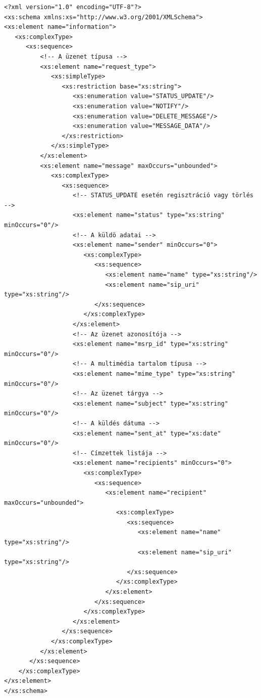\begin{verbatim}
<?xml version="1.0" encoding="UTF-8"?>
<xs:schema xmlns:xs="http://www.w3.org/2001/XMLSchema"> 
<xs:element name="information">
   <xs:complexType>
      <xs:sequence>
          <!-- A üzenet típusa -->
          <xs:element name="request_type">
             <xs:simpleType>
                <xs:restriction base="xs:string">                        
                   <xs:enumeration value="STATUS_UPDATE"/>
                   <xs:enumeration value="NOTIFY"/>
                   <xs:enumeration value="DELETE_MESSAGE"/>
                   <xs:enumeration value="MESSAGE_DATA"/>
                </xs:restriction>
             </xs:simpleType>
          </xs:element>                                    
          <xs:element name="message" maxOccurs="unbounded">
             <xs:complexType>                    
                <xs:sequence>
                   <!-- STATUS_UPDATE esetén regisztráció vagy törlés -->
                   <xs:element name="status" type="xs:string" minOccurs="0"/>
                   <!-- A küldö adatai -->
                   <xs:element name="sender" minOccurs="0">
                      <xs:complexType>
                         <xs:sequence>
                            <xs:element name="name" type="xs:string"/>
                            <xs:element name="sip_uri" type="xs:string"/>
                         </xs:sequence>
                      </xs:complexType>
                   </xs:element>
                   <!-- Az üzenet azonosítója -->
                   <xs:element name="msrp_id" type="xs:string" minOccurs="0"/>
                   <!-- A multimédia tartalom típusa -->
                   <xs:element name="mime_type" type="xs:string" minOccurs="0"/>
                   <!-- Az üzenet tárgya -->
                   <xs:element name="subject" type="xs:string" minOccurs="0"/>
                   <!-- A küldés dátuma -->
                   <xs:element name="sent_at" type="xs:date" minOccurs="0"/>
                   <!-- Címzettek listája -->
                   <xs:element name="recipients" minOccurs="0">
                      <xs:complexType>
                         <xs:sequence>
                            <xs:element name="recipient" maxOccurs="unbounded">
                               <xs:complexType>
                                  <xs:sequence>
                                     <xs:element name="name" type="xs:string"/>
                                     <xs:element name="sip_uri" type="xs:string"/>
                                  </xs:sequence>
                               </xs:complexType>
                            </xs:element>
                         </xs:sequence>                    
                      </xs:complexType>                
                   </xs:element>            
                </xs:sequence>
             </xs:complexType>
          </xs:element>            
       </xs:sequence>
    </xs:complexType>
</xs:element>
</xs:schema>
\end{verbatim}
\fontsize{12}{12} 

